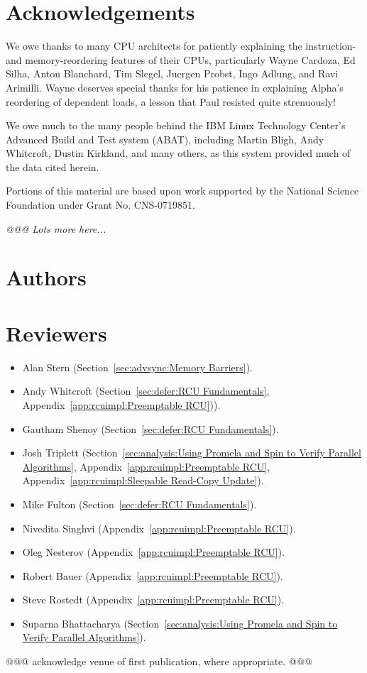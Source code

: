 
\section*{Acknowledgements}

We owe thanks to many CPU architects for patiently explaining the
instruction- and memory-reordering features of their CPUs, particularly
Wayne Cardoza, Ed Silha, Anton Blanchard, Tim Slegel, Juergen Probst,
Ingo Adlung, and Ravi Arimilli.
Wayne deserves special thanks for his patience in explaining Alpha's reordering
of dependent loads, a lesson that Paul resisted quite strenuously!

We owe much to the many people behind the IBM Linux Technology Center's
Advanced Build and Test system (ABAT), including Martin Bligh, Andy
Whitcroft, Dustin Kirkland, and many others, as this system provided much
of the data cited herein.

Portions of this material are based upon work supported by the National
Science Foundation under Grant No. CNS-0719851.

\emph{@@@ Lots more here...}

\section*{Authors}

\section*{Reviewers}

\begin{itemize}
\item	Alan Stern (Section~\ref{sec:advsync:Memory Barriers}).
\item	Andy Whitcroft (Section~\ref{sec:defer:RCU Fundamentals},
	Appendix~\ref{app:rcuimpl:Preemptable RCU})).
\item	Gautham Shenoy (Section~\ref{sec:defer:RCU Fundamentals}).
\item	Josh Triplett
	(Section~\ref{sec:analysis:Using Promela and Spin to Verify Parallel Algorithms},
	Appendix~\ref{app:rcuimpl:Preemptable RCU},
	Appendix~\ref{app:rcuimpl:Sleepable Read-Copy Update}).
\item	Mike Fulton (Section~\ref{sec:defer:RCU Fundamentals}).
\item	Nivedita Singhvi (Appendix~\ref{app:rcuimpl:Preemptable RCU}).
\item	Oleg Nesterov (Appendix~\ref{app:rcuimpl:Preemptable RCU}).
\item	Robert Bauer (Appendix~\ref{app:rcuimpl:Preemptable RCU}).
\item	Steve Rostedt (Appendix~\ref{app:rcuimpl:Preemptable RCU}).
\item	Suparna Bhattacharya
	(Section~\ref{sec:analysis:Using Promela and Spin to Verify Parallel Algorithms}).
\end{itemize}

@@@ acknowledge venue of first publication, where appropriate. @@@
